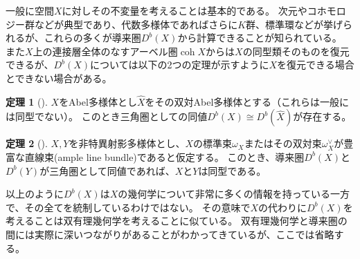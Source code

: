 \documentclass[uplatex,11pt,a4paper,dvipdfmx]{jsarticle}
\numberwithin{equation}{section}
\theoremstyle{definition}
\newtheorem{theorem}{定理}[section]
\DeclareMathOperator{\coh}{\mathrm{coh}}
\begin{document}
一般に空間$X$に対しその不変量を考えることは基本的である。
次元やコホモロジー群などが典型であり、代数多様体であればさらに$K$群、標準環などが挙げられるが、これらの多くが導来圏$D^b(X)$から計算できることが知られている。
また$X$上の連接層全体のなすアーベル圏$\coh X$からは$X$の同型類そのものを復元できるが、$D^b(X)$については以下の2つの定理が示すように$X$を復元できる場合とできない場合がある。
\begin{theorem}[\cite{MR607081}]\label{mukai}
    $X$をAbel多様体とし$\hat{X}$をその双対Abel多様体とする（これらは一般には同型でない）。
    このとき三角圏としての同値$D^b(X) \cong D^b(\hat{X})$が存在する。
\end{theorem}
\begin{theorem}[\cite{MR1818984}]
    $X, Y$を非特異射影多様体とし、$X$の標準束$\omega_X$またはその双対束$\omega_X^\vee$が豊富な直線束(ample line bundle)であると仮定する。
    このとき、導来圏$D^b(X)$と$D^b(Y)$が三角圏として同値であれば、$X$と$Y$は同型である。
\end{theorem}
以上のように$D^b(X)$は$X$の幾何学について非常に多くの情報を持っている一方で、その全てを統制しているわけではない。
その意味で$X$の代わりに$D^b(X)$を考えることは双有理幾何学を考えることに似ている。
双有理幾何学と導来圏の間には実際に深いつながりがあることがわかってきているが、ここでは省略する。
\end{document}
